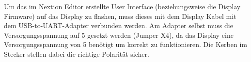 
Um das im Nextion Editor erstellte User Interface (beziehungsweise die Display Firmware) auf das Display zu flashen, muss dieses mit dem Display Kabel mit dem \gls{USB-to-UART}-Adapter verbunden werden. Am Adapter selbst muss die Versorgungsspannung auf \unit{5}{\volt} gesetzt werden (Jumper X4), da das Display eine Versorgungsspannung von \unit{5}{\volt} benötigt um korrekt zu funktionieren. Die Kerben im Stecker stellen dabei die richtige Polarität sicher.

